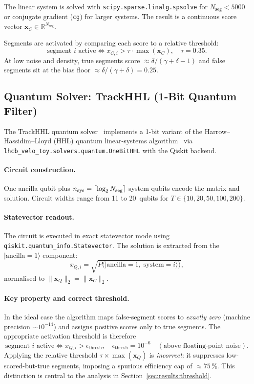 \documentclass[11pt,a4paper]{article}
\newcommand{\Nseg}{N_{\mathrm{seg}}}
\newcommand{\ntrk}{T}
\newcommand{\Qthresh}{\epsilon_{\mathrm{thresh}}}
\newcommand{\codepath}[1]{\texttt{#1}}
\begin{document}
The linear system is solved with \codepath{scipy.sparse.linalg.spsolve} for
$\Nseg<5000$ or conjugate gradient (\codepath{cg}) for larger systems.  The result is
a continuous score vector $\mathbf{x}_C\in\mathbb{R}^{\Nseg}$.

Segments are activated by comparing each score to a relative threshold:
\begin{equation}
  \text{segment }i\text{ active} \iff x_{C,i} > \tau\cdot\max(\mathbf{x}_C),
  \quad\tau=0.35.
\end{equation}
At low noise and density, true segments score $\approx\delta/(\gamma+\delta-1)$ and
false segments sit at the bias floor $\approx\delta/(\gamma+\delta)=0.25$.

\subsection{Quantum Solver: TrackHHL (1-Bit Quantum Filter)}
\label{sec:theory:quantum}

The TrackHHL quantum solver~\cite{onebqf} implements a 1-bit variant of the
Harrow--Hassidim--Lloyd (HHL) quantum linear-systems algorithm~\cite{hhl} via
\codepath{lhcb\_velo\_toy.solvers.quantum.OneBitHHL} with the Qiskit backend.

\paragraph{Circuit construction.}
One ancilla qubit plus $n_{\rm sys}=\lceil\log_2\Nseg\rceil$ system qubits encode the
matrix and solution.  Circuit widths range from 11 to 20~qubits for
$\ntrk\in\{10, 20, 50, 100, 200\}$.

\paragraph{Statevector readout.}
The circuit is executed in exact statevector mode using
\codepath{qiskit.quantum\_info.Statevector}.  The solution is extracted from the
$|\text{ancilla}=1\rangle$ component:
\begin{equation}
  x_{Q,i} = \sqrt{P\bigl(|\text{ancilla}=1,\;\text{system}=i\rangle\bigr)},
\end{equation}
normalised to $\|\mathbf{x}_Q\|_2=\|\mathbf{x}_C\|_2$.

\paragraph{Key property and correct threshold.}
In the ideal case the algorithm maps false-segment scores to \emph{exactly zero}
(machine precision $\sim10^{-14}$) and assigns positive scores only to true segments.
The appropriate activation threshold is therefore
\begin{equation}
  \text{segment }i\text{ active} \iff x_{Q,i} > \Qthresh,
  \quad\Qthresh = 10^{-6}\quad(\text{above floating-point noise}).
  \label{eq:qthresh}
\end{equation}
Applying the relative threshold $\tau\times\max(\mathbf{x}_Q)$ is \emph{incorrect}:
it suppresses low-scored-but-true segments, imposing a spurious efficiency cap of
$\approx\!75\,\%$.  This distinction is central to the analysis in
Section~\ref{sec:results:threshold}.
\end{document}
